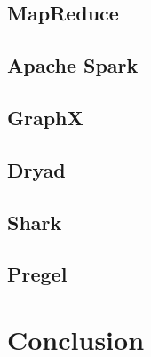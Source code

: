 \documentclass[]{article}
\begin{document}
\subsection{MapReduce}

\subsection{Apache Spark}

\subsection{GraphX}

\subsection{Dryad}

\subsection{Shark}

\subsection{Pregel}

\section{Conclusion}



\end{document}
